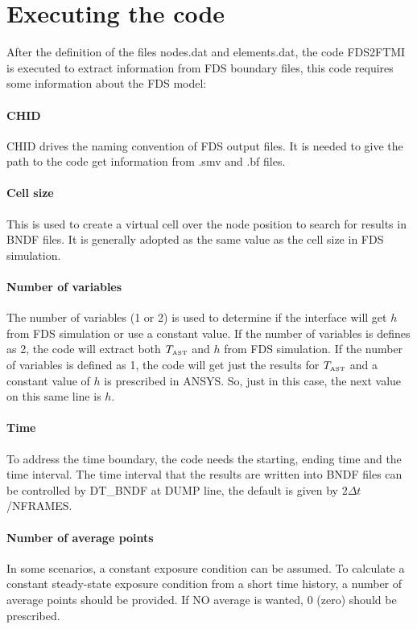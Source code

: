 \documentclass[11pt]{book}
\begin{document}
\section{Executing the code}

After the definition of the files nodes.dat and elements.dat, the code FDS2FTMI is executed to extract information from FDS boundary files, this code requires some information about the FDS model:

\paragraph{CHID} 
{\ct CHID} drives the naming convention of FDS output files. It is needed to give the path to the code get information from .smv and .bf files. 
\paragraph{Cell size} 
This is used to create a virtual cell over the node position to search for results in {\ct BNDF} files. It is generally adopted as the same value as the cell size in FDS simulation.
\paragraph{Number of variables} 
The number of variables (1 or 2) is used to determine if the interface will get $h$ from FDS simulation or use a constant value. 
If the number of variables is defines as 2, the code will extract both $T_{\hbox{\tiny AST}}$ and $h$ from FDS simulation. If the number of variables is defined as 1, the code will get just the results for $T_{\hbox{\tiny AST}}$ and a constant value of $h$ is prescribed in A{\footnotesize NSYS}. So, just in this case, the next value on this same line is $h$. 
\paragraph{Time} 
To address the time boundary, the code needs the starting, ending time and the time interval. The time interval that the results are written into {\ct BNDF} files can be controlled by {\ct DT\_BNDF} at {\ct DUMP} line, the default is given by $2 \Delta t$/{\footnotesize NFRAMES}.
\paragraph{Number of average points} 
In some scenarios, a constant exposure condition can be assumed. To calculate a constant steady-state exposure condition from 
a short time history, a number of average points should be provided. If NO average is wanted, 0 (zero) should be prescribed.
\end{document}
